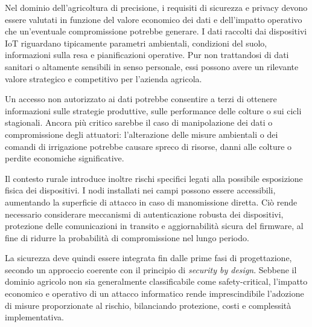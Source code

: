 Nel dominio dell’agricoltura di precisione, i requisiti di sicurezza e privacy devono essere valutati in funzione del valore economico dei dati e dell’impatto operativo che un’eventuale compromissione potrebbe generare. I dati raccolti dai dispositivi IoT riguardano tipicamente parametri ambientali, condizioni del suolo, informazioni sulla resa e pianificazioni operative. Pur non trattandosi di dati sanitari o altamente sensibili in senso personale, essi possono avere un rilevante valore strategico e competitivo per l’azienda agricola.

Un accesso non autorizzato ai dati potrebbe consentire a terzi di ottenere informazioni sulle strategie produttive, sulle performance delle colture o sui cicli stagionali. Ancora più critico sarebbe il caso di manipolazione dei dati o compromissione degli attuatori: l’alterazione delle misure ambientali o dei comandi di irrigazione potrebbe causare spreco di risorse, danni alle colture o perdite economiche significative.

Il contesto rurale introduce inoltre rischi specifici legati alla possibile esposizione fisica dei dispositivi. I nodi installati nei campi possono essere accessibili, aumentando la superficie di attacco in caso di manomissione diretta. Ciò rende necessario considerare meccanismi di autenticazione robusta dei dispositivi, protezione delle comunicazioni in transito e aggiornabilità sicura del firmware, al fine di ridurre la probabilità di compromissione nel lungo periodo.

La sicurezza deve quindi essere integrata fin dalle prime fasi di progettazione, secondo un approccio coerente con il principio di \textit{security by design}. Sebbene il dominio agricolo non sia generalmente classificabile come safety-critical, l’impatto economico e operativo di un attacco informatico rende imprescindibile l’adozione di misure proporzionate al rischio, bilanciando protezione, costi e complessità implementativa.